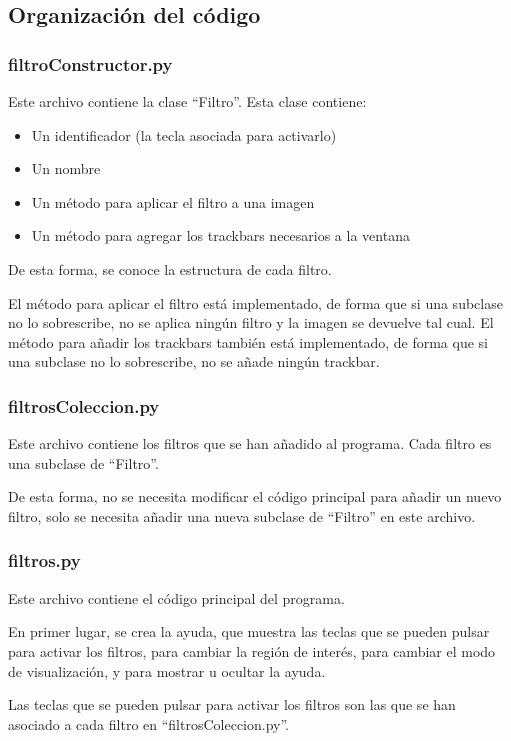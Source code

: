 \documentclass[12pt]{article}
\begin{document}
\subsection*{Organización del código}

\subsubsection*{filtroConstructor.py}
Este archivo contiene la clase ``Filtro''.  Esta clase contiene:
\begin{itemize}
    \item Un identificador (la tecla asociada para activarlo)
    \item Un nombre
    \item Un método para aplicar el filtro a una imagen
    \item Un método para agregar los trackbars necesarios a la ventana
\end{itemize}

De esta forma, se conoce la estructura de cada filtro. 

El método para aplicar el filtro está implementado, de forma que si una subclase no lo sobrescribe, no se aplica ningún filtro y la imagen se devuelve tal cual. El método para añadir los trackbars también está implementado, de forma que si una subclase no lo sobrescribe, no se añade ningún trackbar.

\subsubsection*{filtrosColeccion.py}
Este archivo contiene los filtros que se han añadido al programa. Cada filtro es una subclase de ``Filtro''.

De esta forma, no se necesita modificar el código principal para añadir un nuevo filtro, solo se necesita añadir una nueva subclase de ``Filtro'' en este archivo.

\subsubsection*{filtros.py}
Este archivo contiene el código principal del programa.

En primer lugar, se crea la ayuda, que muestra las teclas que se pueden pulsar para activar los filtros, para cambiar la región de interés, para cambiar el modo de visualización, y para mostrar u ocultar la ayuda.

Las teclas que se pueden pulsar para activar los filtros son las que se han asociado a cada filtro en ``filtrosColeccion.py''. 
\end{document}
